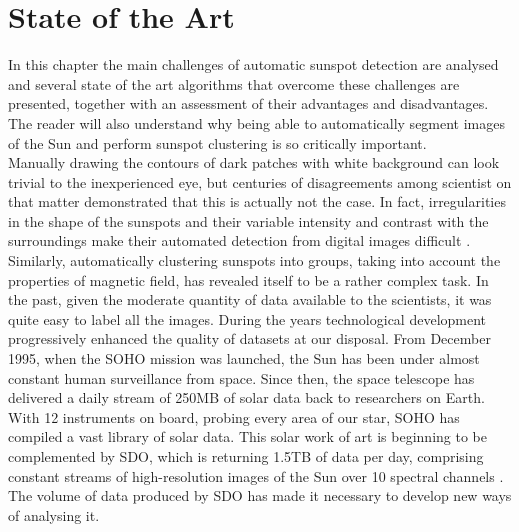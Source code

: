\chapter{State of the Art}
\label{capitolo3}
\thispagestyle{empty}

\noindent In this chapter the main challenges of automatic sunspot detection are analysed and several state of the art algorithms that overcome these challenges are presented, together with an assessment of their advantages and disadvantages. The reader will also understand why being able to automatically segment images of the Sun and perform sunspot clustering is so critically important. \\ Manually drawing the contours of dark patches with white background can look trivial to the inexperienced eye, but centuries of disagreements among scientist on that matter demonstrated that this is actually not the case. In fact, irregularities in the shape of the sunspots and their variable intensity and contrast with the surroundings make their automated detection from digital images difficult \cite{curto2008automatic}. Similarly, automatically clustering sunspots into groups, taking into account the properties of magnetic field, has revealed itself to be a rather complex task. In the past, given the moderate quantity of data available to the scientists, it was quite easy to label all the images. During the years technological development progressively enhanced the quality of datasets at our disposal. From December 1995, when the SOHO mission was launched, the Sun has been under almost constant human surveillance from space. Since then, the space telescope has delivered a daily stream of 250MB of solar data back to researchers on Earth. With 12 instruments on board, probing every area of our star, SOHO has compiled a vast library of solar data. This solar work of art is beginning to be complemented by SDO, which is returning 1.5TB of data per day, comprising constant streams of high-resolution images of the Sun over 10 spectral channels \cite{esa-soho}. The volume of data produced by SDO has made it necessary to develop new ways of analysing it.\\
